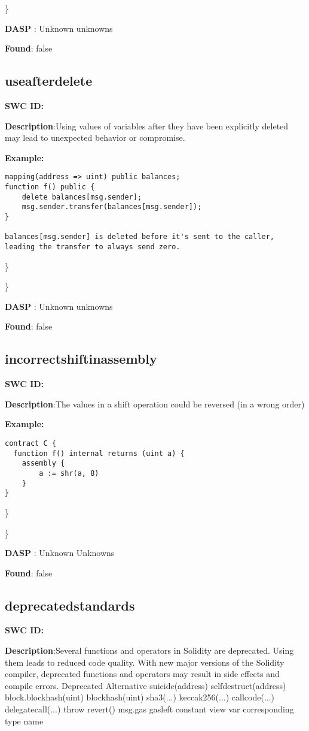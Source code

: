 \documentclass{article}
\begin{document}
\} 

\textbf{DASP} : Unknown unknowns

\textbf{Found}: false

\subsection{use\textunderscore after\textunderscore delete} 
\textbf{SWC \textunderscore ID:} 

\textbf{Description}:Using values of variables after they have been explicitly deleted may lead to unexpected behavior or compromise.


\textbf{Example:} 
\begin{verbatim}
mapping(address => uint) public balances;
function f() public {
    delete balances[msg.sender];
    msg.sender.transfer(balances[msg.sender]);
}

balances[msg.sender] is deleted before it's sent to the caller, leading the transfer to always send zero.

\end{verbatim}\} 

\} 

\textbf{DASP} : Unknown unknowns

\textbf{Found}: false

\subsection{incorrect\textunderscore shift\textunderscore in\textunderscore assembly} 
\textbf{SWC \textunderscore ID:} 

\textbf{Description}:The values in a shift operation could be reversed (in a wrong order)


\textbf{Example:} 
\begin{verbatim}
contract C {
  function f() internal returns (uint a) {
    assembly {
        a := shr(a, 8)
    }
}

\end{verbatim}\} 

\} 

\textbf{DASP} : Unknown Unknowns

\textbf{Found}: false

\subsection{deprecated\textunderscore standards} 
\textbf{SWC \textunderscore ID:} 

\textbf{Description}:Several functions and operators in Solidity are deprecated. Using them leads to reduced code quality. With new major versions of the Solidity compiler, deprecated functions and operators may result in side effects and compile errors.
  Deprecated              Alternative
  suicide(address)        selfdestruct(address)
  block.blockhash(uint)   blockhash(uint)
  sha3(...)               keccak256(...)
  callcode(...)           delegatecall(...)
  throw                   revert()
  msg.gas                 gasleft
  constant                view
  var                     corresponding type name
\end{document}
